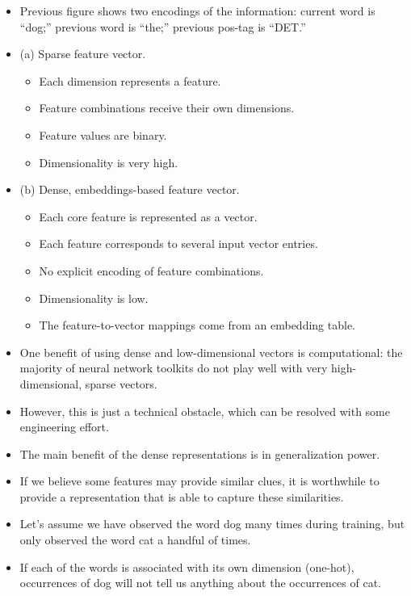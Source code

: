 \begin{itemize}
\item Previous figure shows two encodings of the information: current word
is ``dog;'' previous word is ``the;'' previous pos-tag is ``DET.''

\item (a) Sparse feature vector. 
\begin{itemize}
\item Each dimension represents a feature. 
\item Feature combinations receive their own dimensions.
\item Feature values are binary. 
\item Dimensionality is very high.
\end{itemize}

\item (b) Dense, embeddings-based feature vector. 
\begin{itemize}
\item Each core feature is represented as a vector.
\item Each feature corresponds to several input vector entries.
\item No explicit encoding of feature combinations.
\item Dimensionality is low.
\item The feature-to-vector mappings come from an embedding table.
\end{itemize}
\item One benefit of using dense and low-dimensional vectors is computational: the majority of neural network toolkits do not play well with very high-dimensional, sparse vectors.
\item However, this is just a technical obstacle, which can be resolved with some engineering effort.

\item The main benefit of the dense representations is in generalization power.

\item If we believe some features may provide similar clues, it is worthwhile to provide a representation that is able to capture these similarities. 

\item Let's assume we have observed the word dog many times during
training, but only observed the word cat a handful of times. 

\item If each of the words is associated with its own dimension (one-hot), occurrences of dog will not tell us anything about the occurrences of cat. 


\end{itemize}
